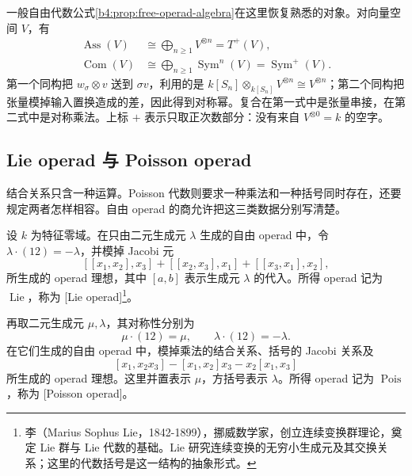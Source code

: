 \ProseParagraphBreak
一般自由代数公式\cref{b4:prop:free-operad-algebra}在这里恢复熟悉的对象。对向量空间 \(V\)，有
\[
	\begin{aligned}
		\operatorname{Ass}(V)&\cong\bigoplus_{n\ge1}V^{\otimes n}=T^+(V),\\
		\operatorname{Com}(V)&\cong\bigoplus_{n\ge1}\operatorname{Sym}^n(V)=\operatorname{Sym}^+(V).
	\end{aligned}
\]
第一个同构把 \(w_\sigma\otimes v\) 送到 \(\sigma v\)，利用的是 \(k[S_n]\otimes_{k[S_n]}V^{\otimes n}\cong V^{\otimes n}\)；第二个同构把张量模掉输入置换造成的差，因此得到对称幂。复合在第一式中是张量串接，在第二式中是对称乘法。上标 \(+\) 表示只取正次数部分：没有来自 \(V^{\otimes0}=k\) 的空字。

\subsection{Lie operad 与 Poisson operad}
\label{b4:subsec:G02:02}

结合关系只含一种运算。Poisson 代数则要求一种乘法和一种括号同时存在，还要规定两者怎样相容。自由 operad 的商允许把这三类数据分别写清楚。

\begin{definition}\label{b4:def:lie-poisson-operads}
	设 \(k\) 为特征零域。在只由二元生成元 \(\lambda\) 生成的自由 operad 中，令 \(\lambda\cdot(12)=-\lambda\)，并模掉 Jacobi 元
	\[
		[[x_1,x_2],x_3]+[[x_2,x_3],x_1]+[[x_3,x_1],x_2],
	\]
	所生成的 operad 理想，其中 \([a,b]\) 表示生成元 \(\lambda\) 的代入。所得 operad 记为 \(\operatorname{Lie}\)，称为 [Lie operad]\footnote{李（Marius Sophus Lie，1842-1899），挪威数学家，创立连续变换群理论，奠定 Lie 群与 Lie 代数的基础。Lie 研究连续变换的无穷小生成元及其交换关系；这里的代数括号是这一结构的抽象形式。}。

	再取二元生成元 \(\mu,\lambda\)，其对称性分别为
	\[
		\mu\cdot(12)=\mu,\qquad \lambda\cdot(12)=-\lambda.
	\]
	在它们生成的自由 operad 中，模掉乘法的结合关系、括号的 Jacobi 关系及
	\begin{equation}\label{b4:eq:poisson-operad-leibniz}
		[x_1,x_2x_3]-[x_1,x_2]x_3-x_2[x_1,x_3]
	\end{equation}
	所生成的 operad 理想。这里并置表示 \(\mu\)，方括号表示 \(\lambda\)。所得 operad 记为 \(\operatorname{Pois}\)，称为 [Poisson operad]。
\end{definition}

